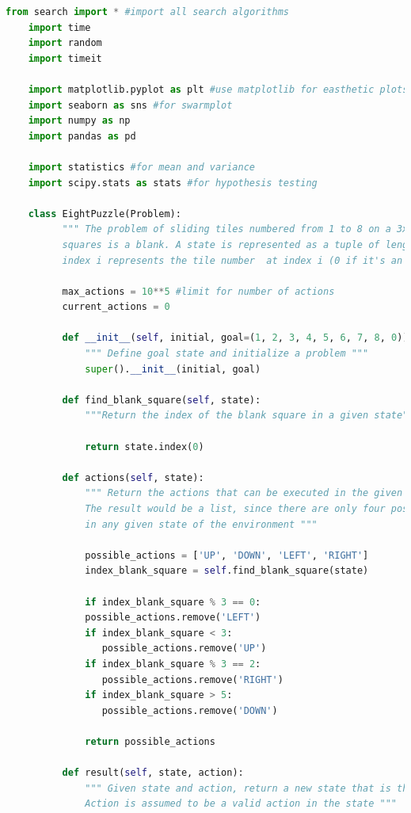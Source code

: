 \documentclass{article}
\begin{document}
\begin{lstlisting}[language=Python, caption=Full Code Listing]
    from search import * #import all search algorithms
	import time  
	import random
	import timeit
	
	import matplotlib.pyplot as plt #use matplotlib for easthetic plots 
	import seaborn as sns #for swarmplot
	import numpy as np
	import pandas as pd
	
	import statistics #for mean and variance
	import scipy.stats as stats #for hypothesis testing
	
	class EightPuzzle(Problem):
	      """ The problem of sliding tiles numbered from 1 to 8 on a 3x3 board, where one of the
	      squares is a blank. A state is represented as a tuple of length 9, where  element at
	      index i represents the tile number  at index i (0 if it's an empty square) """
	
	      max_actions = 10**5 #limit for number of actions
	      current_actions = 0
	
	      def __init__(self, initial, goal=(1, 2, 3, 4, 5, 6, 7, 8, 0)):
	          """ Define goal state and initialize a problem """
	          super().__init__(initial, goal)
		
	      def find_blank_square(self, state):
	          """Return the index of the blank square in a given state"""
	
	          return state.index(0)
	
	      def actions(self, state):
	          """ Return the actions that can be executed in the given state.
	          The result would be a list, since there are only four possible actions
	          in any given state of the environment """
	
	          possible_actions = ['UP', 'DOWN', 'LEFT', 'RIGHT']
	          index_blank_square = self.find_blank_square(state)
	
	          if index_blank_square % 3 == 0:
	          possible_actions.remove('LEFT')
	          if index_blank_square < 3:
	             possible_actions.remove('UP')
	          if index_blank_square % 3 == 2:
	             possible_actions.remove('RIGHT')
	          if index_blank_square > 5:
	             possible_actions.remove('DOWN')
	
	          return possible_actions
	
	      def result(self, state, action):
	          """ Given state and action, return a new state that is the result of the action.
	          Action is assumed to be a valid action in the state """
	

\end{lstlisting}
\end{document}
